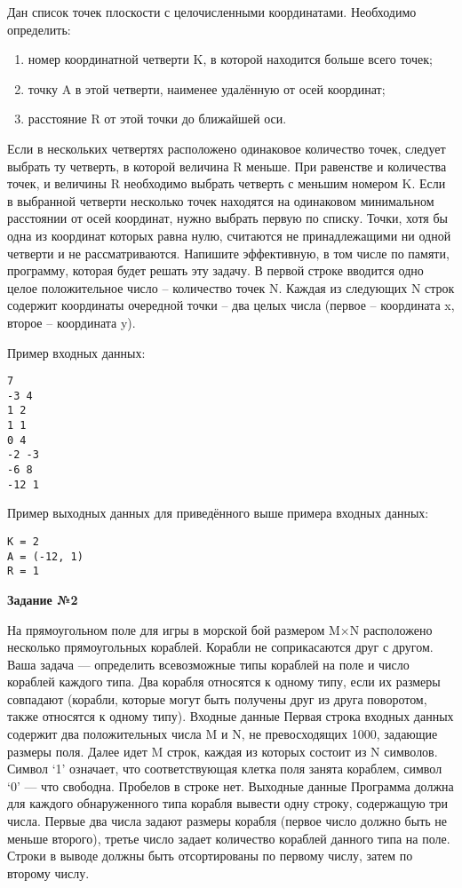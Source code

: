 Дан список точек плоскости с целочисленными координатами. Необходимо определить:
\begin{enumerate}
  \item номер координатной четверти K, в которой находится больше всего точек;
  \item точку A в этой четверти, наименее удалённую от осей координат;
  \item расстояние R от этой точки до ближайшей оси.
\end{enumerate}
  
Если в нескольких четвертях расположено одинаковое количество точек, следует выбрать ту четверть, в которой величина R меньше. При равенстве и количества точек, и величины R необходимо выбрать четверть с меньшим номером K. 
Если в выбранной четверти несколько точек находятся на одинаковом минимальном расстоянии от осей координат, нужно выбрать
первую по списку. Точки, хотя бы одна из координат которых равна нулю, считаются не принадлежащими ни одной четверти и не рассматриваются. Напишите эффективную, в том числе по памяти, программу, которая будет решать эту задачу.
В первой строке вводится одно целое положительное число – количество точек N. Каждая из следующих N строк содержит координаты очередной точки – два целых числа (первое – координата x, второе – координата y).

Пример входных данных:
\begin{verbatim}
7
-3 4
1 2
1 1
0 4
-2 -3
-6 8
-12 1
\end{verbatim}

Пример выходных данных для приведённого выше примера входных данных:
\begin{verbatim}
K = 2
A = (-12, 1)
R = 1
\end{verbatim}


{\bf Задание №2}

На прямоугольном поле для игры в морской бой размером M×N расположено несколько прямоугольных кораблей. Корабли не соприкасаются друг с другом. Ваша задача — определить всевозможные типы кораблей на поле и число кораблей каждого типа. 
Два корабля относятся к одному типу, если их размеры совпадают (корабли, которые могут быть получены друг из друга поворотом, также относятся к одному типу).
Входные данные
Первая строка входных данных содержит два положительных числа M и N, не превосходящих 1000, задающие размеры поля. Далее идет M строк, каждая из которых состоит из N символов. 
Символ `1' означает, что соответствующая клетка поля занята кораблем, символ `0' — что свободна. Пробелов в строке нет.
Выходные данные
Программа должна для каждого обнаруженного типа корабля вывести одну строку, содержащую три числа. Первые два числа задают размеры корабля (первое число должно быть не меньше второго), 
третье число задает количество кораблей данного типа на поле. Строки в выводе должны быть отсортированы по первому числу, затем по второму числу.


